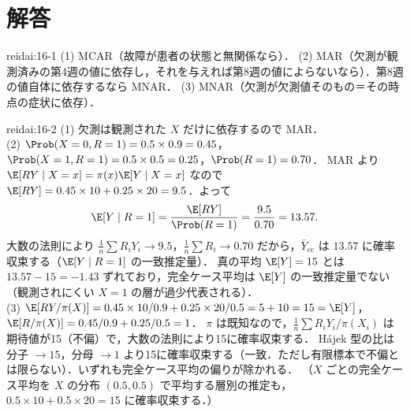 \section{解答}\label{sec:16-sol}
\begin{kaitou}{reidai:16-1}
(1) MCAR（故障が患者の状態と無関係なら）．
(2) MAR（欠測が観測済みの第4週の値に依存し，それを与えれば第8週の値によらないなら）．第8週の値自体に依存するなら MNAR．
(3) MNAR（欠測が欠測値そのもの＝その時点の症状に依存）．
\end{kaitou}

\begin{kaitou}{reidai:16-2}
(1) 欠測は観測された $X$ だけに依存するので MAR．\\
(2) $\Prob(X=0,R=1)=0.5\times0.9=0.45$，$\Prob(X=1,R=1)=0.5\times0.5=0.25$，$\Prob(R=1)=0.70$．
MAR より $\E[RY\mid X=x]=\pi(x)\E[Y\mid X=x]$ なので $\E[RY]=0.45\times10+0.25\times20=9.5$．よって
\[
\E[Y\mid R=1]=\frac{\E[RY]}{\Prob(R=1)}=\frac{9.5}{0.70}=13.57 .
\]
大数の法則により $\frac1n\sum R_iY_i\to9.5$，$\frac1n\sum R_i\to0.70$ だから，$\bar Y_{\mathrm{cc}}$ は $13.57$ に確率収束する（$\E[Y\mid R=1]$ の一致推定量）．
真の平均 $\E[Y]=15$ とは $13.57-15=-1.43$ ずれており，完全ケース平均は $\E[Y]$ の一致推定量でない（観測されにくい $X=1$ の層が過少代表される）．\\
(3) $\E[RY/\pi(X)]=0.45\times10/0.9+0.25\times20/0.5=5+10=15=\E[Y]$，$\E[R/\pi(X)]=0.45/0.9+0.25/0.5=1$．
$\pi$ は既知なので，$\frac1n\sum R_iY_i/\pi(X_i)$ は期待値が15（不偏）で，大数の法則により15に確率収束する．
Hájek 型の比は分子 $\to15$，分母 $\to1$ より15に確率収束する（一致．ただし有限標本で不偏とは限らない）．いずれも完全ケース平均の偏りが除かれる．
（$X$ ごとの完全ケース平均を $X$ の分布 $(0.5,0.5)$ で平均する層別の推定も，$0.5\times10+0.5\times20=15$ に確率収束する．）
\end{kaitou}

